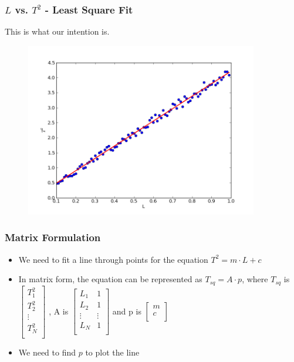 \documentclass[14pt,compress]{beamer}
\begin{document}
\begin{frame}[fragile]
\frametitle{$L$ vs. $T^2$ - Least Square Fit}
This is what our intention is.
\vspace{-0.1in}
\begin{figure}
\includegraphics[width=4in]{data/least-sq-fit}
\end{figure}
\end{frame}

\begin{frame}[fragile]
\frametitle{Matrix Formulation}
\begin{itemize}
\item We need to fit a line through points for the equation $T^2 = m \cdot L+c$
\item In matrix form, the equation can be represented as $T_{sq} = A \cdot p$, where $T_{sq}$ is
  $\begin{bmatrix}
  T^2_1 \\
  T^2_2 \\
  \vdots\\
  T^2_N \\
  \end{bmatrix}$
, A is   
  $\begin{bmatrix}
  L_1 & 1 \\
  L_2 & 1 \\
  \vdots & \vdots\\
  L_N & 1 \\
  \end{bmatrix}$
  and p is 
  $\begin{bmatrix}
  m\\
  c\\
  \end{bmatrix}$
\item We need to find $p$ to plot the line
\end{itemize}
\end{frame}
\end{document}
